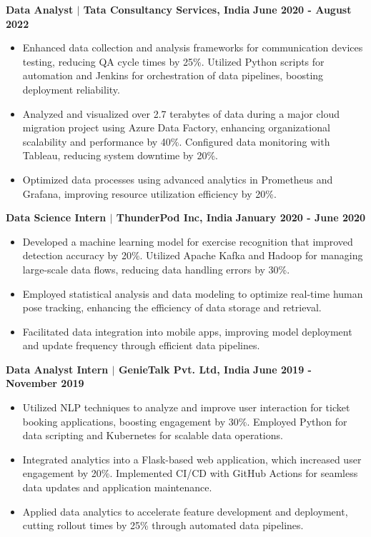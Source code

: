 \documentclass{article}
\begin{document}
\noindent \textbf{Data Analyst $\mid$ Tata Consultancy Services, India}  \hfill \textbf{June 2020 - August 2022}
\begin{itemize}[noitemsep,nolistsep,leftmargin=*]
\item {\small Enhanced data collection and analysis frameworks for communication devices testing, reducing QA cycle times by 25\%. Utilized Python scripts for automation and Jenkins for orchestration of data pipelines, boosting deployment reliability.}
\item {\small Analyzed and visualized over 2.7 terabytes of data during a major cloud migration project using Azure Data Factory, enhancing organizational scalability and performance by 40\%. Configured data monitoring with Tableau, reducing system downtime by 20\%.}
\item {\small Optimized data processes using advanced analytics in Prometheus and Grafana, improving resource utilization efficiency by 20\%.}
\end{itemize}

\vspace{2mm} 

\noindent \textbf{Data Science Intern $\mid$ ThunderPod Inc, India}  \hfill \textbf{January 2020 - June 2020}
\begin{itemize}[noitemsep,nolistsep,leftmargin=*]
\item {\small Developed a machine learning model for exercise recognition that improved detection accuracy by 20\%. Utilized Apache Kafka and Hadoop for managing large-scale data flows, reducing data handling errors by 30\%.}
\item {\small Employed statistical analysis and data modeling to optimize real-time human pose tracking, enhancing the efficiency of data storage and retrieval.}
\item {\small Facilitated data integration into mobile apps, improving model deployment and update frequency through efficient data pipelines.}
\end{itemize}

\vspace{2mm} 

\noindent \textbf{Data Analyst Intern $\mid$ GenieTalk Pvt. Ltd, India}  \hfill \textbf{June 2019 - November 2019}
\begin{itemize}[noitemsep,nolistsep,leftmargin=*]
\item {\small Utilized NLP techniques to analyze and improve user interaction for ticket booking applications, boosting engagement by 30\%. Employed Python for data scripting and Kubernetes for scalable data operations.}
\item {\small Integrated analytics into a Flask-based web application, which increased user engagement by 20\%. Implemented CI/CD with GitHub Actions for seamless data updates and application maintenance.}
\item {\small Applied data analytics to accelerate feature development and deployment, cutting rollout times by 25\% through automated data pipelines.}
\end{itemize}
\end{document}
